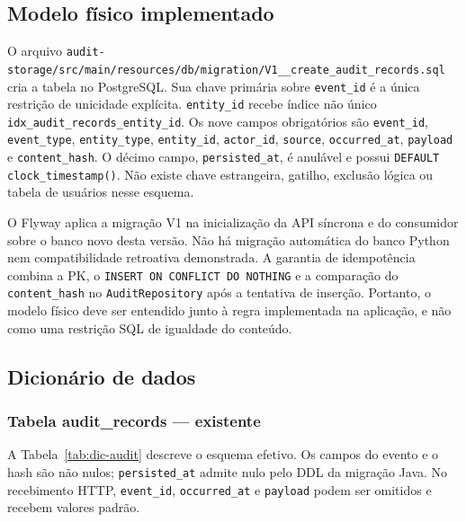 \subsection{Modelo físico implementado}
O arquivo \texttt{audit-storage/src/main/resources/db/migration/V1\_\_create\_audit\_records.sql} cria a tabela no PostgreSQL. Sua chave primária sobre \texttt{event\_id} é a única restrição de unicidade explícita. \texttt{entity\_id} recebe índice não único \texttt{idx\_audit\_records\_entity\_id}. Os nove campos obrigatórios são \texttt{event\_id}, \texttt{event\_type}, \texttt{entity\_type}, \texttt{entity\_id}, \texttt{actor\_id}, \texttt{source}, \texttt{occurred\_at}, \texttt{payload} e \texttt{content\_hash}. O décimo campo, \texttt{persisted\_at}, é anulável e possui \texttt{DEFAULT clock\_timestamp()}. Não existe chave estrangeira, gatilho, exclusão lógica ou tabela de usuários nesse esquema.

O Flyway aplica a migração V1 na inicialização da API síncrona e do consumidor sobre o banco novo desta versão. Não há migração automática do banco Python nem compatibilidade retroativa demonstrada. A garantia de idempotência combina a PK, o \texttt{INSERT ON CONFLICT DO NOTHING} e a comparação do \texttt{content\_hash} no \texttt{AuditRepository} após a tentativa de inserção. Portanto, o modelo físico deve ser entendido junto à regra implementada na aplicação, e não como uma restrição SQL de igualdade do conteúdo.

\subsection{Dicionário de dados}

\subsubsection{Tabela audit\_records --- existente}
A Tabela~\ref{tab:dic-audit} descreve o esquema efetivo. Os campos do evento e o hash são não nulos; \texttt{persisted\_at} admite nulo pelo DDL da migração Java. No recebimento HTTP, \texttt{event\_id}, \texttt{occurred\_at} e \texttt{payload} podem ser omitidos e recebem valores padrão.

